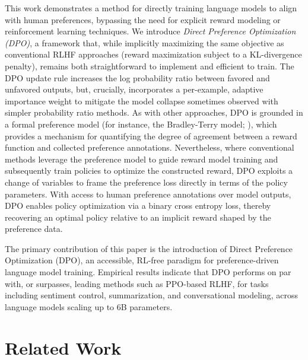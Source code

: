 This work demonstrates a method for directly training language models to align with human preferences, bypassing the need for explicit reward modeling or reinforcement learning techniques. We introduce \textit{{Direct Preference Optimization} (DPO)}, a framework that, while implicitly maximizing the same objective as conventional RLHF approaches (reward maximization subject to a KL-divergence penalty), remains both straightforward to implement and efficient to train. The DPO update rule increases the log probability ratio between favored and unfavored outputs, but, crucially, incorporates a per-example, adaptive importance weight to mitigate the model collapse sometimes observed with simpler probability ratio methods. As with other approaches, DPO is grounded in a formal preference model (for instance, the Bradley-Terry model; \cite{bradley1952rankanalysis}), which provides a mechanism for quantifying the degree of agreement between a reward function and collected preference annotations. Nevertheless, where conventional methods leverage the preference model to guide reward model training and subsequently train policies to optimize the constructed reward, DPO exploits a change of variables to frame the preference loss directly in terms of the policy parameters. With access to human preference annotations over model outputs, DPO enables policy optimization via a binary cross entropy loss, thereby recovering an optimal policy relative to an implicit reward shaped by the preference data.

The primary contribution of this paper is the introduction of Direct Preference Optimization (DPO), an accessible, RL-free paradigm for preference-driven language model training. Empirical results indicate that DPO performs on par with, or surpasses, leading methods such as PPO-based RLHF, for tasks including sentiment control, summarization, and conversational modeling, across language models scaling up to 6B parameters.

\section{Related Work}

